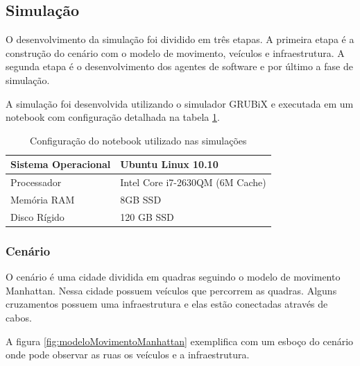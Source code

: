 \subsection{Simulação}
\label{subsec:simulacao}

O desenvolvimento da simulação foi dividido em três etapas. A primeira etapa é a construção do cenário com o modelo de movimento, veículos e infraestrutura. A segunda etapa é o desenvolvimento dos agentes de software e por último a fase de simulação. 

A simulação foi desenvolvida utilizando o simulador GRUBiX e executada em um notebook com configuração detalhada na tabela \ref{tab:configuracaoNotebook}.

\begin{table}[ht]
	\centering
	\begin{tabular}{|l|l|}
		\hline
		Sistema Operacional & Ubuntu Linux 10.10              	\\ \hline
		Processador         & Intel Core i7-2630QM (6M Cache) 	\\ \hline
		Memória RAM         & 8GB SSD                         	\\ \hline
		Disco Rígido 		& 120 GB SSD 						\\ \hline 
	\end{tabular}
	\caption{Configuração do notebook utilizado nas simulações}
	\label{tab:configuracaoNotebook}
\end{table}

\subsubsection{Cenário}

O cenário é uma cidade dividida em quadras seguindo o modelo de movimento Manhattan. Nessa cidade possuem veículos que percorrem as quadras. Alguns cruzamentos possuem uma infraestrutura e elas estão conectadas através de cabos. 

A figura \ref{fig:modeloMovimentoManhattan} exemplifica com um esboço do cenário onde pode observar as ruas os veículos e a infraestrutura.

